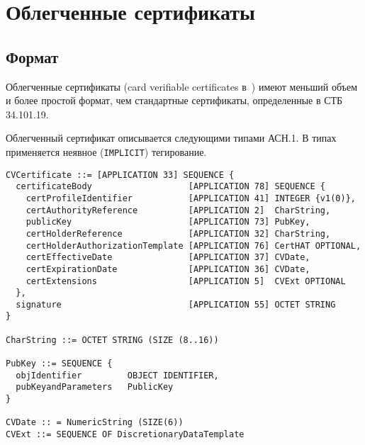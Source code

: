 \chapter{Облегченные сертификаты}\label{CERTS}

\section{Формат}\label{CERTS.Format}

Облегченные сертификаты (card verifiable certificates в~\cite{LightCerts}) 
имеют меньший объем и более простой формат, чем стандартные сертификаты,
определенные в СТБ 34.101.19.

Облегченный сертификат описывается следующими типами АСН.1.
В типах применяется неявное (\verb|IMPLICIT|) тегирование. 

\begin{verbatim}
CVCertificate ::= [APPLICATION 33] SEQUENCE {
  certificateBody                   [APPLICATION 78] SEQUENCE {
    certProfileIdentifier           [APPLICATION 41] INTEGER {v1(0)},
    certAuthorityReference          [APPLICATION 2]  CharString,
    publicKey                       [APPLICATION 73] PubKey,
    certHolderReference             [APPLICATION 32] CharString,
    certHolderAuthorizationTemplate [APPLICATION 76] CertHAT OPTIONAL,
    certEffectiveDate               [APPLICATION 37] CVDate,
    certExpirationDate              [APPLICATION 36] CVDate,
    certExtensions                  [APPLICATION 5]  CVExt OPTIONAL 
  },
  signature                         [APPLICATION 55] OCTET STRING
}

CharString ::= OCTET STRING (SIZE (8..16))

PubKey ::= SEQUENCE {
  objIdentifier         OBJECT IDENTIFIER,
  pubKeyandParameters   PublicKey
}

CVDate :: = NumericString (SIZE(6))
CVExt ::= SEQUENCE OF DiscretionaryDataTemplate
\end{verbatim}

